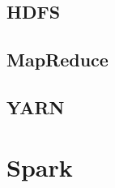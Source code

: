 \documentclass[12pt]{article}
\begin{document}
    \subsection{HDFS}
    \subsection{MapReduce}
    \subsection{YARN}

  \section{Spark}

  
  \printbibliography
  
\end{document}
